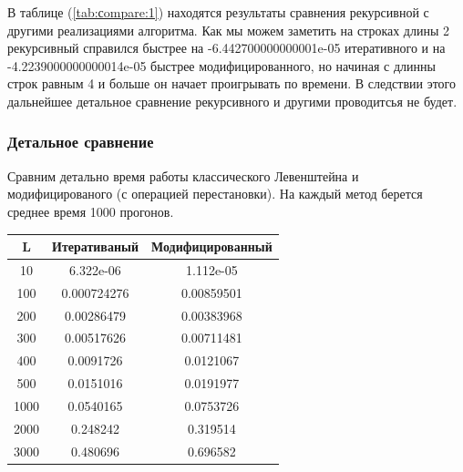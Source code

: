 \documentclass[a4paper, 14pt]{article}
\begin{document}
	В таблице (\ref{tab:сompare:1}) находятся результаты сравнения рекурсивной с другими реализациями алгоритма. Как мы можем заметить на строках длины 2 рекурсивный справился быстрее на -6.442700000000001e-05 итеративного и на -4.2239000000000014e-05 быстрее модифицированного, но начиная с длинны строк равным 4 и больше он начает проигрывать по времени. В следствии этого дальнейшее детальное сравнение рекурсивного и другими проводитсья не будет.
	
	\subsubsection{Детальное сравнение}
	
	Сравним детально время работы классического Левенштейна и модифицированого (с операцией перестановки). На каждый метод берется среднее время 1000 прогонов. \\
	
	\begin{tabular}{|c | c | c |}
		L & Итеративаный & Модифицированный \\
		\hline
		10 & 6.322e-06 & 1.112e-05 \\
		100 & 0.000724276 & 0.00859501 \\
		200 & 0.00286479 & 0.00383968 \\
		300 & 0.00517626 & 0.00711481 \\
		400 & 0.0091726 & 0.0121067 \\
		500 & 0.0151016 & 0.0191977 \\
		1000 & 0.0540165 & 0.0753726 \\
		2000 & 0.248242 & 0.319514 \\
		3000 & 0.480696 & 0.696582 \\
		\hline
	\end{tabular}

	
\end{document}

